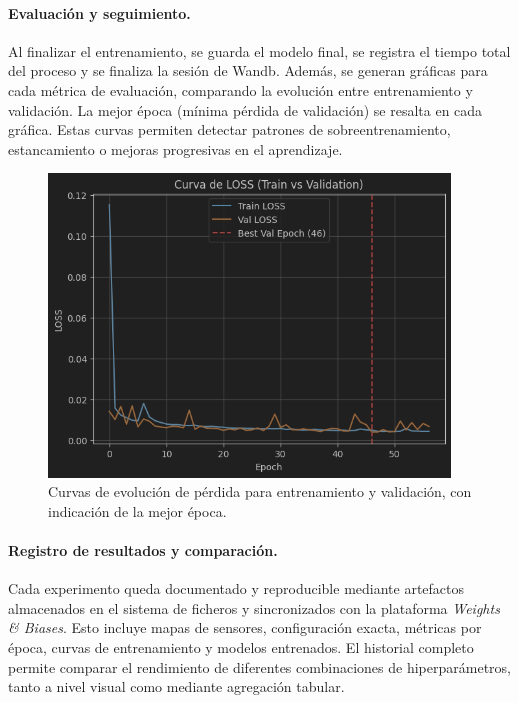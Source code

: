 \paragraph{Evaluación y seguimiento.}  
Al finalizar el entrenamiento, se guarda el modelo final, se registra el tiempo total del proceso y se finaliza la sesión de Wandb. Además, se generan gráficas para cada métrica de evaluación, comparando la evolución entre entrenamiento y validación. La mejor época (mínima pérdida de validación) se resalta en cada gráfica. Estas curvas permiten detectar patrones de sobreentrenamiento, estancamiento o mejoras progresivas en el aprendizaje.

\begin{figure}[H]
	\centering
	\includegraphics[width=0.95\textwidth]{includes/cap5/loss_curve_example.png}
	\caption{Curvas de evolución de pérdida para entrenamiento y validación, con indicación de la mejor época.}
	\label{fig:loss_curve_example}
\end{figure}

\paragraph{Registro de resultados y comparación.}  
Cada experimento queda documentado y reproducible mediante artefactos almacenados en el sistema de ficheros y sincronizados con la plataforma \textit{Weights \& Biases}. Esto incluye mapas de sensores, configuración exacta, métricas por época, curvas de entrenamiento y modelos entrenados. El historial completo permite comparar el rendimiento de diferentes combinaciones de hiperparámetros, tanto a nivel visual como mediante agregación tabular.
